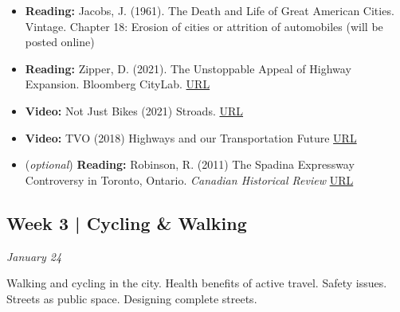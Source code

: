 \documentclass[11pt]{article}
\begin{document}
	\begin{itemize}
		
		\item \textbf{Reading:} Jacobs, J. (1961). The Death and Life of Great American Cities. Vintage.
		Chapter 18: Erosion of cities or attrition of automobiles (will be posted online)
					
		\item \textbf{Reading:} Zipper, D. (2021). The Unstoppable Appeal of Highway Expansion. Bloomberg CityLab. \href{https://www.bloomberg.com/news/features/2021-09-28/why-widening-highways-doesn-t-bring-traffic-relief}{URL}
		
		\item \textbf{Video:} Not Just Bikes (2021) Stroads. \href{https://www.youtube.com/watch?v=ORzNZUeUHAM}{URL}
		
		\item \textbf{Video:} TVO (2018) 
		Highways and our Transportation Future \href{https://www.tvo.org/video/highways-and-our-transportation-future}{URL}
		
		\item (\textit{optional}) \textbf{Reading:} Robinson, R. (2011) The Spadina Expressway Controversy in Toronto, Ontario. \textit{ Canadian Historical Review} \href{https://www.utpjournals.press/doi/pdf/10.3138/chr.92.2.295}{URL}
	\end{itemize}





	\subsection*{Week 3 | Cycling \& Walking}
	
	\textit{January 24}
	
	Walking and cycling in the city. Health benefits of active travel. Safety issues. Streets as public space. Designing complete streets. 
	
\end{document}
